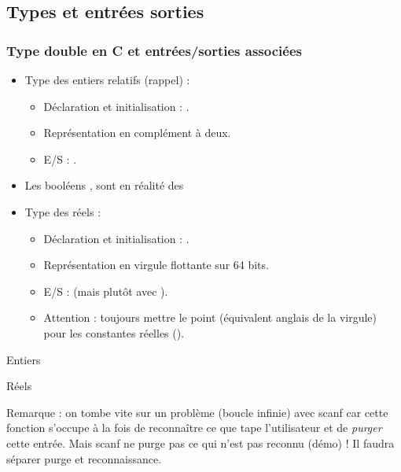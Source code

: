 \documentclass[xcolor=pdftex,svgnames,table]{beamer}
\begin{document}
\subsection[Types char, double et E/S]{Types et entrées sorties}
\begin{frame}
  \frametitle{Type double en C et entrées/sorties associées}

  \begin{itemize}
  \item Type des entiers relatifs  \alert{}  (rappel) :
    \begin{itemize}
    \item Déclaration et initialisation : .
    \item Représentation en complément à deux.
    \item E/S : \alert{}.
    \end{itemize}
  \item Les booléens \alert{}, sont en réalité des 
\item Type des réels \alert{} :
  \begin{itemize}
    \item Déclaration et initialisation : .
    \item Représentation en virgule flottante sur 64 bits.
    \item E/S : \alert{} (mais plutôt  avec ).
    \item \alert{Attention :} toujours mettre le point (équivalent
      anglais de la virgule) pour les constantes réelles ().
    \end{itemize}
  \end{itemize}
\end{frame}

\begin{frame}
  \begin{block}{Entiers}
  \end{block}\pause

\begin{block}{Réels}
\end{block}
 Remarque : on tombe vite sur un problème (boucle infinie) avec scanf car cette fonction
 s'occupe à la fois de reconnaître ce que tape l'utilisateur et
 de \emph{purger} cette entrée. Mais scanf ne purge pas ce qui n'est
 pas reconnu (démo) ! Il faudra séparer purge et reconnaissance.
\end{frame}
\end{document}
